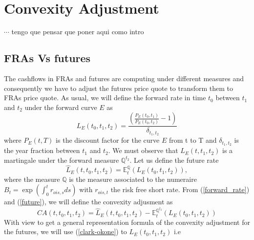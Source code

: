 \documentclass[a4paper,10pt]{article}
\newcommand{\1}{\mathbf{1}}
\begin{document}
 

\section{Convexity Adjustment}\label{sec:CA}
$\cdots$  tengo que pensar que poner aqui como intro

\subsection{FRAs Vs futures}
The cashflows in FRAs and futures are computing under different measures and consequently we have to adjust the futures price quote to transform them to FRAs price quote. As usual, we will define the forward rate  in time $t_0$ between $t_1$ and $t_2$ under the forward curve $E$ as
\begin{equation}\label{forward_rate}
L_{E}(t_0, t_1, t_2) = \frac{\left(\frac{P_{E}(t_0,t_1)}{P_{E}(t_0,t_2)} - 1 \right)}{\delta_{t_1,t_2}}
\end{equation} 
where $P_{E}(t,T)$ is the discount factor for the curve $E$ from t to T and $\delta_{t_1,t_2}$ is the year fraction between $t_1$ and $t_2$. We must observe that $L_{E}(t, t_1, t_2)$ is a martingale under the forward measure $\mathbb{Q}^{t_2}$. Let us define the future rate   
\begin{equation}\label{future}
\hat{L}_{E}(t,t_0, t_1, t_2) = \mathbb{E}_t^{\mathbb{Q}}\left(L_{E}(t_0, t_1, t_2) \right), 
\end{equation}
where the measure $\mathbb{Q}$ is the measure associated to the numeraire $B_t=\exp\left(\int_{0}^{t} r_{ois, s} ds \right)$ with $ r_{ois, t}$ the risk free short rate. From (\ref{forward_rate}) and (\ref{future}), we will define the convexity adjusment as
\begin{equation*}
CA(t, t_0, t_1, t_2) = \hat{L}_{E}(t,t_0, t_1, t_2) - \mathbb{E}_t^{\mathbb{Q}^{t_2}}\left(L_{E}(t_0, t_1, t_2) \right)
\end{equation*}
With view to get a general representation formula of the convexity adjustment for the futures, we will use (\ref{clark-okone}) to 
$L_{E}(t_0,t_1,t_2)$ i.e
\end{document}
